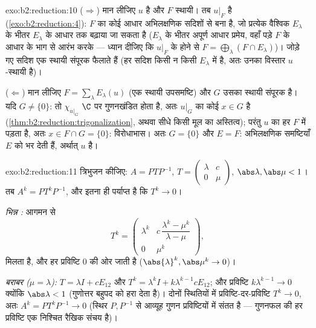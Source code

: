 \begin{solution}{exo:b2:reduction:10}
($\Rightarrow$) मान लीजिए $u$  है और $F$ स्थायी। तब $u|_F$  है
(\cref{exo:b2:reduction:4}): $F$ का कोई आधार अभिलक्षणिक सदिशों से बना है, जो प्रत्येक वैश्विक
 $E_\lambda$ के भीतर $E_\lambda$ के आधार तक बढ़ाया जा सकता है ($E_\lambda$ के
भीतर अपूर्ण आधार प्रमेय, वहाँ पड़े $F$ के आधार के भाग से आरंभ करके ---
ध्यान दीजिए कि $u|_F$ के  होने से $F = \bigoplus_\lambda (F \cap E_\lambda)$)। जोड़े गए सदिश एक स्थायी
संपूरक फैलाते हैं (हर सदिश किसी न किसी $E_\lambda$ में है, अतः उनका विस्तार
$u$-स्थायी है)।

($\Leftarrow$) मान लीजिए $F = \sum_\lambda E_\lambda(u)$ (एक स्थायी उपसमष्टि) और $G$ उसका स्थायी संपूरक है।
यदि $G \neq \{0\}$: तो $\chi_{u|_G}$ $\C$ पर गुणनखंडित होता है, अतः $u|_G$ का कोई  $x \in G$ है (\cref{thm:b2:reduction:trigonalization}, अथवा सीधे किसी मूल का अस्तित्व); परंतु $u$ का हर
 $F$ में पड़ता है, अतः $x \in F
\cap G = \{0\}$: विरोधाभास। अतः $G = \{0\}$ और
$E = F$: अभिलक्षणिक समष्टियाँ $E$ को भर देती हैं, अर्थात् $u$
 है।
\end{solution}

\begin{solution}{exo:b2:reduction:11}
त्रिभुजन कीजिए: $A = PTP^{-1}$, $T = \begin{pmatrix} \lambda & c\\ 0 &
\mu\end{pmatrix}$, $\abs\lambda, \abs\mu < 1$। तब $A^k =
PT^kP^{-1}$, और इतना ही पर्याप्त है कि $T^k \to 0$।

\emph{भिन्न :} आगमन से
\[
T^k = \begin{pmatrix}
\lambda^k & c\,\dfrac{\lambda^k - \mu^k}{\lambda - \mu}\\[4pt]
0 & \mu^k
\end{pmatrix},
\]
मिलता है, और हर प्रविष्टि $0$ की ओर जाती है ($\abs{\lambda}^k, \abs\mu^k \to 0$)।

\emph{बराबर  ($\mu = \lambda$):} $T = \lambda I + cE_{12}$ और $T^k = \lambda^k I + k\lambda^{k-1}cE_{12}$; और प्रविष्टि $k\lambda^{k-1} \to 0$
क्योंकि $\abs\lambda < 1$ (गुणोत्तर बहुपद को हरा देता है)। दोनों स्थितियों में
प्रविष्टि-दर-प्रविष्टि $T^k \to 0$, अतः $A^k =
PT^kP^{-1} \to 0$ (स्थिर $P, P^{-1}$ से आव्यूह गुणन
प्रविष्टियों में संतत है --- गुणनफल की हर प्रविष्टि एक निश्चित रैखिक
संचय है)।
\end{solution}

